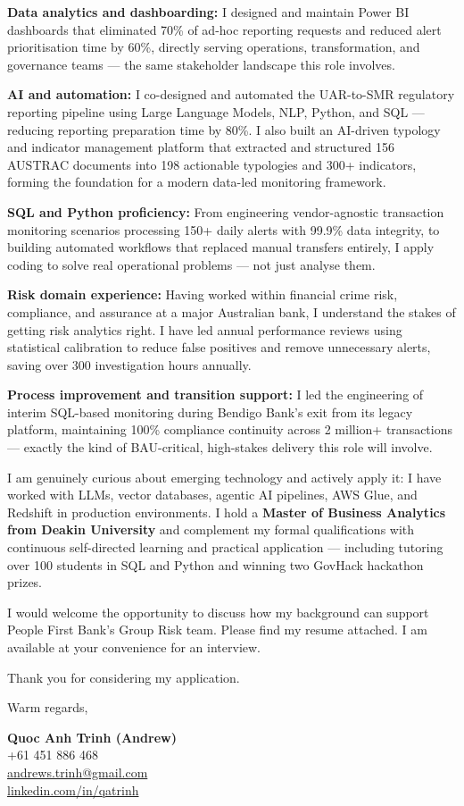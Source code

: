 \documentclass[11pt, a4paper]{letter}
\begin{document}
\textbf{Data analytics and dashboarding:}
I designed and maintain Power BI dashboards that eliminated 70\% of ad-hoc reporting requests and reduced alert prioritisation time by 60\%, directly serving operations, transformation, and governance teams --- the same stakeholder landscape this role involves.

\textbf{AI and automation:}
I co-designed and automated the UAR-to-SMR regulatory reporting pipeline using Large Language Models, NLP, Python, and SQL --- reducing reporting preparation time by 80\%. I also built an AI-driven typology and indicator management platform that extracted and structured 156 AUSTRAC documents into 198 actionable typologies and 300+ indicators, forming the foundation for a modern data-led monitoring framework.

\textbf{SQL and Python proficiency:}
From engineering vendor-agnostic transaction monitoring scenarios processing 150+ daily alerts with 99.9\% data integrity, to building automated workflows that replaced manual transfers entirely, I apply coding to solve real operational problems --- not just analyse them.

\textbf{Risk domain experience:}
Having worked within financial crime risk, compliance, and assurance at a major Australian bank, I understand the stakes of getting risk analytics right. I have led annual performance reviews using statistical calibration to reduce false positives and remove unnecessary alerts, saving over 300 investigation hours annually.

\textbf{Process improvement and transition support:}
I led the engineering of interim SQL-based monitoring during Bendigo Bank's exit from its legacy platform, maintaining 100\% compliance continuity across 2 million+ transactions --- exactly the kind of BAU-critical, high-stakes delivery this role will involve.

I am genuinely curious about emerging technology and actively apply it: I have worked with LLMs, vector databases, agentic AI pipelines, AWS Glue, and Redshift in production environments. I hold a \textbf{Master of Business Analytics from Deakin University} and complement my formal qualifications with continuous self-directed learning and practical application --- including tutoring over 100 students in SQL and Python and winning two GovHack hackathon prizes.

I would welcome the opportunity to discuss how my background can support People First Bank's Group Risk team. Please find my resume attached. I am available at your convenience for an interview.

Thank you for considering my application.

\vspace{20pt}

Warm regards,

\vspace{30pt}

\textbf{Quoc Anh Trinh (Andrew)}\\
+61 451 886 468\\
\href{mailto:andrews.trinh@gmail.com}{andrews.trinh@gmail.com}\\
\href{https://www.linkedin.com/in/qatrinh}{linkedin.com/in/qatrinh}
\end{document}
